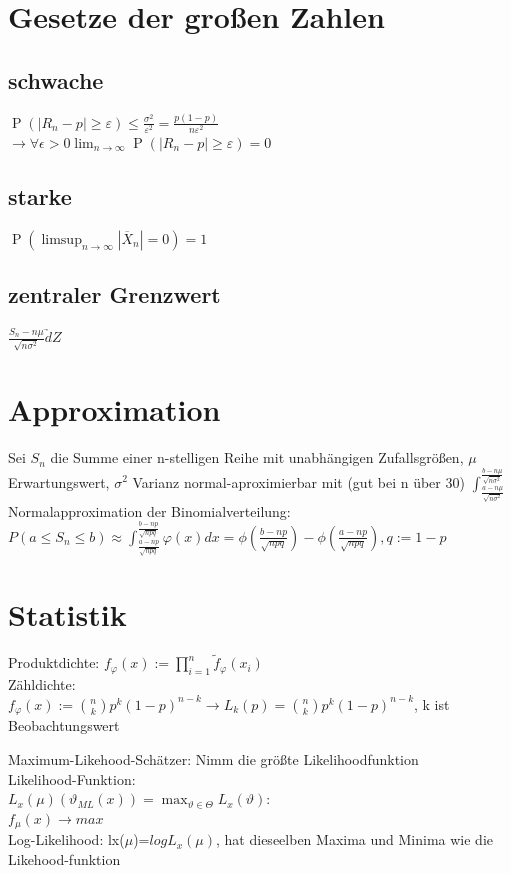 \documentclass[]{article}
\begin{document}
\newpage
\section{Gesetze der großen Zahlen}
\subsection{schwache}
$\operatorname{P}\left(|R_n - p| \geq \varepsilon \right) \leq \frac{\sigma^2}{\varepsilon^2} = \frac{p(1-p)}{n \varepsilon^2}$  \\
$\rightarrow \forall \epsilon>0 \lim_{n \to \infty} \operatorname{P}\left(|R_n - p| \geq \varepsilon \right) = 0$
\subsection{starke}
$\operatorname{P}\left(\limsup_{n\rightarrow\infty}|\overline{X}_n|=0\right)=1$
\subsection{zentraler Grenzwert}
$\frac{S_n-n\mu}{\sqrt{n \sigma^2}} \underrightarrow{d} Z $
\section{Approximation}
Sei $S_n$ die Summe einer n-stelligen Reihe mit unabhängigen Zufallsgrößen, $\mu$ Erwartungswert, $\sigma^2$ Varianz
normal-aproximierbar mit  (gut bei n über 30) 
$\int_{\frac{a-n\mu}{\sqrt{n\sigma^2}}}^{\frac{b-n\mu}{\sqrt{n\sigma^2}}}$\\
Normalapproximation der Binomialverteilung: $P(a \leq S_n \leq b) \approx \int_{\frac{a-np}{\sqrt{npq}}}^{\frac{b-np}{\sqrt{npq}}} \varphi (x) dx = \phi(\frac{b-np}{\sqrt{npq}}) - \phi(\frac{a-np}{\sqrt{npq}}), q:=1-p $

\section{Statistik}
Produktdichte: $f_\varphi(x):=\prod_{i=1}^{n}\tilde{f}_\varphi(x_i)$\\
Zähldichte:\\
$f_\varphi(x):=$$\binom{n}{k}p^k(1-p)^{n-k}\rightarrow L_k(p)=\binom{n}{k}p^k(1-p)^{n-k}$, k ist Beobachtungswert

Maximum-Likehood-Schätzer: Nimm die größte Likelihoodfunktion \\ 
Likelihood-Funktion: \\ $L_x(\mu)(\vartheta_{ML}(x))=\max_{\vartheta \in \Theta}L_x(\vartheta)$:\\
$f_\mu(x)\rightarrow max$\\
Log-Likelihood: lx($\mu$)=$log L_x(\mu)$, hat dieseelben Maxima und Minima wie 
die Likehood-funktion
\end{document}
